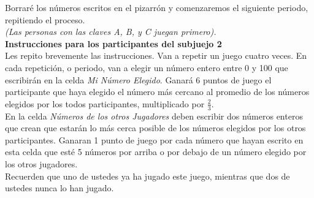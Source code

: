 Borraré los números escritos en el pizarrón y comenzaremos el siguiente periodo, repitiendo el proceso.\\

\textit{(Las personas con las claves A, B, y C juegan primero).}\\

\textbf{Instrucciones para los participantes del subjuejo 2}\\

Les repito brevemente las instrucciones. Van a repetir un juego cuatro veces. En cada repetición, o periodo, van a elegir un número entero entre 0 y 100 que escribirán en la celda \textit{Mi Número Elegido}. Ganará 6 puntos de juego el participante que haya elegido el número más cercano al promedio de los números elegidos por los todos participantes, multiplicado por $\frac{2}{3}$.\\

En la celda \textit{Números de los otros Jugadores} deben escribir dos números enteros que crean que estarán lo más cerca posible de los números elegidos por los otros participantes. Ganaran 1 punto de juego por cada número que hayan escrito en esta celda que esté 5 números por arriba o por debajo de un número elegido por los otros jugadores.\\

Recuerden que uno de ustedes ya ha jugado este juego, mientras que dos de ustedes nunca lo han jugado.\\